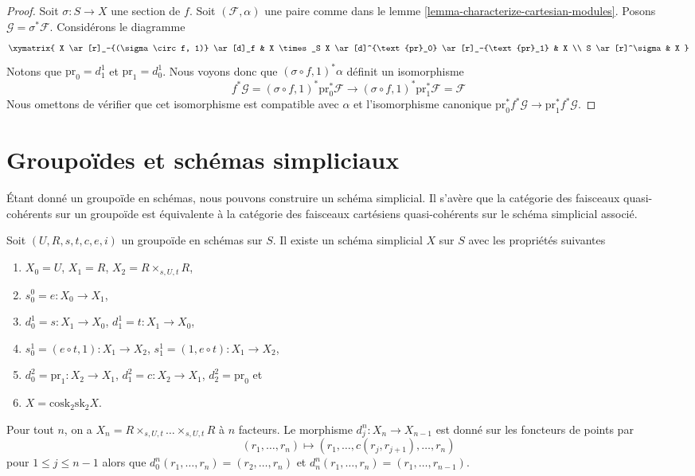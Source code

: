 \begin{proof}
Soit $\sigma : S \to X$ une section de $f$. Soit $(\mathcal{F}, \alpha)$
une paire comme dans le lemme \ref{lemma-characterize-cartesian-modules}.
Posons $\mathcal{G} = \sigma^*\mathcal{F}$. Considérons le diagramme
$$
\xymatrix{
X \ar[r]_-{(\sigma \circ f, 1)} \ar[d]_f &
X \times_S X \ar[d]^{\text{pr}_0} \ar[r]_-{\text{pr}_1} & X \\
S \ar[r]^\sigma & X
}
$$
Notons que $\text{pr}_0 = d^1_1$ et $\text{pr}_1 = d^1_0$. Nous voyons donc que
$(\sigma \circ f, 1)^*\alpha$ définit un isomorphisme
$$
f^*\mathcal{G} = (\sigma \circ f, 1)^*\text{pr}_0^*\mathcal{F}
\longrightarrow
(\sigma \circ f, 1)^*\text{pr}_1^*\mathcal{F} = \mathcal{F}
$$
Nous omettons de vérifier que cet isomorphisme est compatible
avec $\alpha$ et l'isomorphisme canonique
$\text{pr}_0^*f^*\mathcal{G} \to \text{pr}_1^*f^*\mathcal{G}$.
\end{proof}






\section{Groupoïdes et schémas simpliciaux}
\label{section-groupoids-simplicial}

\noindent
Étant donné un groupoïde en schémas, nous pouvons construire un schéma simplicial.
Il s'avère que la catégorie des faisceaux quasi-cohérents sur un groupoïde
est équivalente à la catégorie des faisceaux cartésiens quasi-cohérents
sur le schéma simplicial associé.

\begin{lemma}
\label{lemma-groupoid-simplicial}
Soit $(U, R, s, t, c, e, i)$ un groupoïde en schémas sur $S$.
Il existe un schéma simplicial $X$ sur $S$
avec les propriétés suivantes
\begin{enumerate}
\item $X_0 = U$, $X_1 = R$, $X_2 = R \times_{s, U, t} R$,
\item $s_0^0 = e : X_0 \to X_1$,
\item $d^1_0 = s : X_1 \to X_0$, $d^1_1 = t : X_1 \to X_0$,
\item $s_0^1 = (e \circ t, 1) : X_1 \to X_2$,
$s_1^1 = (1, e \circ t) : X_1 \to X_2$,
\item $d^2_0 = \text{pr}_1 : X_2 \to X_1$,
$d^2_1 = c : X_2 \to X_1$,
$d^2_2 = \text{pr}_0$ et
\item $X = \text{cosk}_2 \text{sk}_2 X$.
\end{enumerate}
Pour tout $n$, on a $X_n = R \times_{s, U, t} \ldots \times_{s, U, t} R$
à $n$ facteurs. Le morphisme $d^n_j : X_n \to X_{n - 1}$ est donné sur les
foncteurs de points par
$$
(r_1, \ldots, r_n) \longmapsto (r_1, \ldots, c(r_j, r_{j + 1}), \ldots, r_n)
$$
pour $1 \leq j \leq n - 1$ alors que
$d^n_0(r_1, \ldots, r_n) = (r_2, \ldots, r_n)$ et
$d^n_n(r_1, \ldots, r_n) = (r_1, \ldots, r_{n - 1})$.
\end{lemma}

